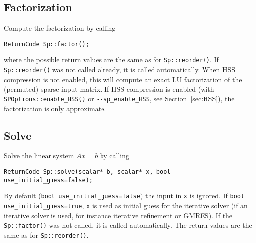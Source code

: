 \documentclass{article}
\begin{document}
\subsection{Factorization}
Compute the factorization by calling
\begin{lstlisting}[style=C]
  ReturnCode Sp::factor();
\end{lstlisting}
where the possible return values are the same as for
\lstinline[style=C]!Sp::reorder()!.  If
\lstinline[style=C]!Sp::reorder()! was not called already, it is
called automatically. When HSS compression is not enabled, this will
compute an exact LU factorization of the (permuted) sparse input
matrix. If HSS compression is enabled (with
\lstinline[style=C]!SPOptions::enable_HSS()! or
\lstinline[style=Bash]!--sp_enable_HSS!, see Section~\ref{sec:HSS}),
the factorization is only approximate.

\subsection{Solve}\label{subsec:use_solve}
Solve the linear system $Ax=b$ by calling
\begin{lstlisting}[style=C]
  ReturnCode Sp::solve(scalar* b, scalar* x, bool use_initial_guess=false);
\end{lstlisting}
By default (\lstinline[style=C]!bool use_initial_guess=false!) the
input in \lstinline[style=C]!x! is ignored. If
\lstinline[style=C]!bool use_initial_guess=true!,
\lstinline[style=C]!x! is used as initial guess for the iterative
solver (if an iterative solver is used, for instance iterative
refinement or GMRES). If the \lstinline[style=C]!Sp::factor()! was not
called, it is called automatically. The return values are the same as
for \lstinline[style=C]!Sp::reorder()!.
\end{document}
